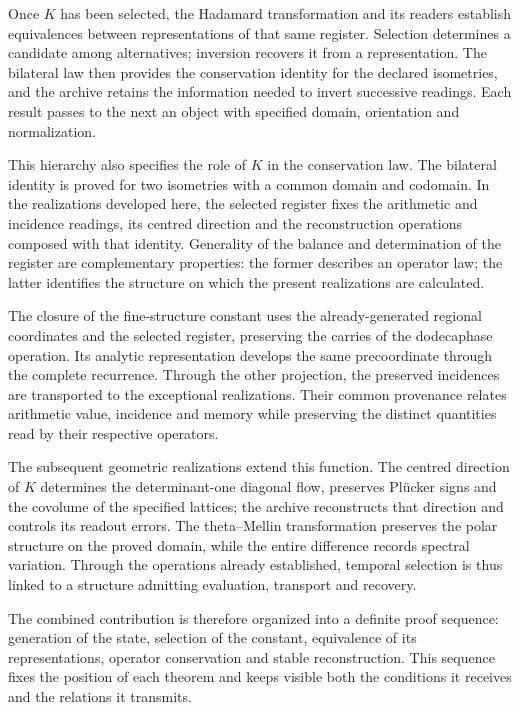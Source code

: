 Once \(K\) has been selected, the Hadamard transformation and its readers
establish equivalences between representations of that same register.
Selection determines a candidate among alternatives; inversion recovers
it from a representation. The bilateral law then provides the
conservation identity for the declared isometries, and the archive retains
the information needed to invert successive readings. Each result passes
to the next an object with specified domain, orientation and normalization.

This hierarchy also specifies the role of \(K\) in the conservation law.
The bilateral identity is proved for two isometries with a common domain
and codomain. In the realizations developed here, the selected register
fixes the arithmetic and incidence readings, its centred direction and
the reconstruction operations composed with that identity. Generality
of the balance and determination of the register are complementary
properties: the former describes an operator law; the latter identifies
the structure on which the present realizations are calculated.

\pagebreak %
The closure of the fine-structure constant uses the already-generated
regional coordinates and the selected register, preserving the carries
of the dodecaphase operation. Its analytic representation develops the
same precoordinate through the complete recurrence. Through the other
projection, the preserved incidences are transported to the exceptional
realizations. Their common provenance relates arithmetic value, incidence
and memory while preserving the distinct quantities read by their
respective operators.

The subsequent geometric realizations extend this function. The centred
direction of \(K\) determines the determinant-one diagonal flow,
preserves Plücker signs and the covolume of the specified lattices; the
archive reconstructs that direction and controls its readout errors.
The theta--Mellin transformation preserves the polar structure on the
proved domain, while the entire difference records spectral variation.
Through the operations already established, temporal selection is thus
linked to a structure admitting evaluation, transport and recovery.

The combined contribution is therefore organized into a definite proof
sequence: generation of the state, selection of the constant, equivalence
of its representations, operator conservation and stable reconstruction.
This sequence fixes the position of each theorem and keeps visible both
the conditions it receives and the relations it transmits.
